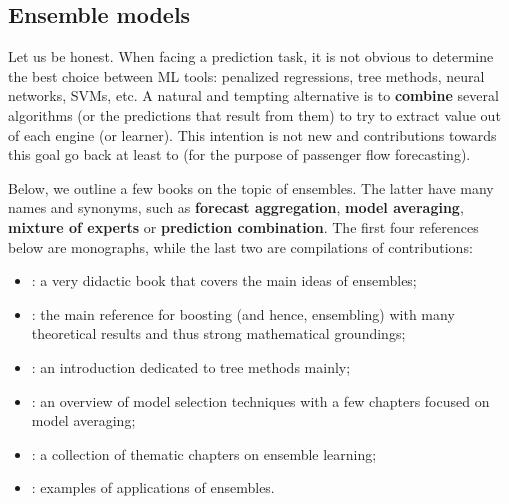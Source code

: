 \subsection{Ensemble models}

Let us be honest. When facing a prediction task, it is not obvious to determine the best choice between ML tools: penalized regressions, tree methods, neural networks, SVMs, etc. A natural and tempting alternative is to \textbf{combine} several algorithms (or the predictions that result from them) to try to extract value out of each engine (or learner). This intention is not new and contributions towards this goal go back at least to \cite{bates1969combination} (for the purpose of passenger flow forecasting).

Below, we outline a few books on the topic of ensembles. The latter have many names and synonyms, such as \textbf{forecast aggregation}, \textbf{model averaging}, \textbf{mixture of experts} or \textbf{prediction combination}. The first four references below are monographs, while the last two are compilations of contributions:

\begin{itemize}
\item \cite{zhou2012ensemble}: a very didactic book that covers the main ideas of ensembles;
\item \cite{schapire2012boosting}: the main reference for boosting (and hence, ensembling) with many theoretical results and thus strong mathematical groundings;
\item \cite{seni2010ensemble}: an introduction dedicated to tree methods mainly;
\item \cite{claeskens2008model}: an overview of model selection techniques with a few chapters focused on model averaging;
\item \cite{zhang2012ensemble}: a collection of thematic chapters on ensemble learning;
\item \cite{okun2011ensembles}: examples of applications of ensembles.
\end{itemize}

